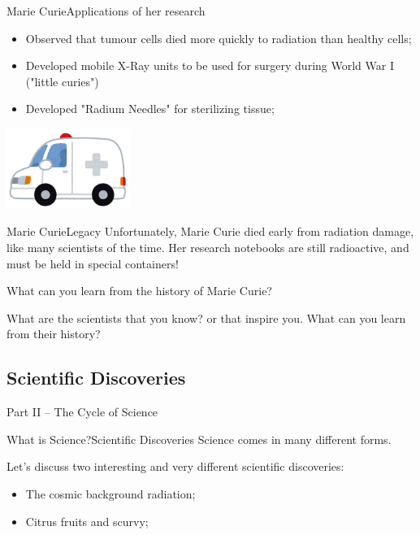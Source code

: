 \begin{frame}{Marie Curie}{Applications of her research}
  \begin{itemize}
    \item Observed that tumour cells died more quickly to radiation than healthy cells;
    \medskip

    \item Developed mobile X-Ray units to be used for surgery during World War I ("little curies")
    \medskip

    \item Developed "Radium Needles" for sterilizing tissue;
  \end{itemize}
  \hfill\includegraphics[width=0.3\textwidth]{../img/irasutoya_ambulance.png}
\end{frame}

\begin{frame}{Marie Curie}{Legacy}
  Unfortunately, Marie Curie died early from radiation damage, like many scientists of the time. Her research notebooks are still radioactive, and must be held in special containers!\vfill

  What can you learn from the history of Marie Curie?\bigskip

  What are the scientists that you know? or that inspire you. What can you learn from their history?
\end{frame}

\subsection{Scientific Discoveries}

\begin{frame}

  \begin{center}
    Part II -- The Cycle of Science
  \end{center}

\end{frame}

\begin{frame}{What is Science?}{Scientific Discoveries}
  Science comes in many different forms.\vfill

  Let's discuss two interesting and very different scientific discoveries:
  \begin{itemize}
    \item The cosmic background radiation;
    \item Citrus fruits and scurvy;
  \end{itemize}
\end{frame}

